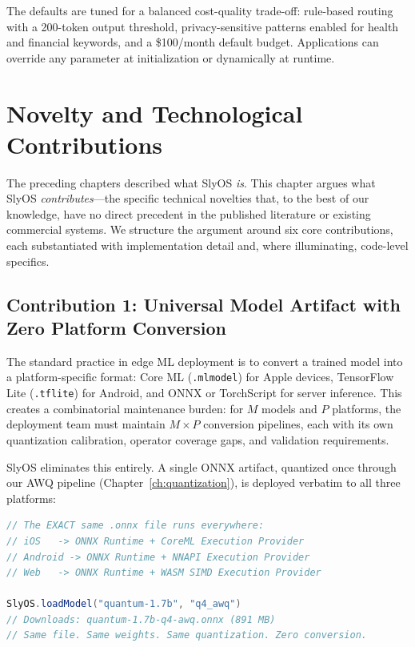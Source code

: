 \documentclass[12pt, letterpaper, twoside]{report}
\begin{document}
The defaults are tuned for a balanced cost-quality trade-off: rule-based routing with a 200-token output threshold, privacy-sensitive patterns enabled for health and financial keywords, and a \$100/month default budget. Applications can override any parameter at initialization or dynamically at runtime.

\chapter{Novelty and Technological Contributions}
\label{ch:novelty}

The preceding chapters described what SlyOS \textit{is}. This chapter argues what SlyOS \textit{contributes}---the specific technical novelties that, to the best of our knowledge, have no direct precedent in the published literature or existing commercial systems. We structure the argument around six core contributions, each substantiated with implementation detail and, where illuminating, code-level specifics.

\section{Contribution 1: Universal Model Artifact with Zero Platform Conversion}
\label{sec:novel_universal}

The standard practice in edge ML deployment is to convert a trained model into a platform-specific format: Core ML (\texttt{.mlmodel}) for Apple devices, TensorFlow Lite (\texttt{.tflite}) for Android, and ONNX or TorchScript for server inference. This creates a combinatorial maintenance burden: for $M$ models and $P$ platforms, the deployment team must maintain $M \times P$ conversion pipelines, each with its own quantization calibration, operator coverage gaps, and validation requirements.

SlyOS eliminates this entirely. A single ONNX artifact, quantized once through our AWQ pipeline (Chapter~\ref{ch:quantization}), is deployed verbatim to all three platforms:

\begin{lstlisting}[language=Java, caption={One artifact, three platforms---no conversion}]
// The EXACT same .onnx file runs everywhere:
// iOS   -> ONNX Runtime + CoreML Execution Provider
// Android -> ONNX Runtime + NNAPI Execution Provider
// Web   -> ONNX Runtime + WASM SIMD Execution Provider

SlyOS.loadModel("quantum-1.7b", "q4_awq")
// Downloads: quantum-1.7b-q4-awq.onnx (891 MB)
// Same file. Same weights. Same quantization. Zero conversion.
\end{lstlisting}
\end{document}
